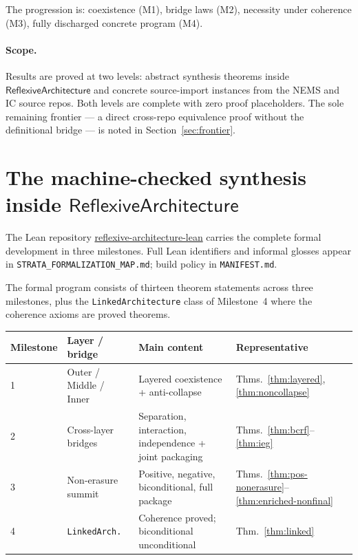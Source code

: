 \documentclass[11pt]{article}
\newcommand{\RAL}{\ensuremath{\mathsf{ReflexiveArchitecture}}}
\begin{document}
The progression is: coexistence (M1), bridge laws (M2), necessity under coherence (M3),
fully discharged concrete program (M4).

\paragraph{Scope.}
Results are proved at two levels: abstract synthesis theorems inside $\RAL$
and concrete source-import instances from the NEMS and IC source repos.
Both levels are complete with zero proof placeholders.  The sole remaining
frontier --- a direct cross-repo equivalence proof without the definitional bridge ---
is noted in Section~\ref{sec:frontier}.

\section{The machine-checked synthesis inside \texorpdfstring{$\RAL$}{RAL}}
\label{sec:formalization}

The Lean repository \url{reflexive-architecture-lean} carries the complete formal
development in three milestones.  Full Lean identifiers and informal glosses appear
in \texttt{STRATA\_FORMALIZATION\_MAP.md}; build policy in \texttt{MANIFEST.md}.

The formal program consists of thirteen theorem statements across three milestones,
plus the \texttt{LinkedArchitecture} class of Milestone~4 where the coherence axioms
are proved theorems.

\begin{center}
\small
\setlength{\tabcolsep}{4pt}
\begin{tabular}{p{1.7cm}p{2.8cm}p{4.7cm}p{2.6cm}}
\toprule
Milestone & Layer / bridge & Main content & Representative \\
\midrule
1 & Outer / Middle / Inner & Layered coexistence + anti-collapse
  & Thms.~\ref{thm:layered}, \ref{thm:noncollapse} \\[2pt]
2 & Cross-layer bridges & Separation, interaction, independence + joint packaging
  & Thms.~\ref{thm:bcrf}--\ref{thm:ieg} \\[2pt]
3 & Non-erasure summit & Positive, negative, biconditional, full package
  & Thms.~\ref{thm:pos-nonerasure}--\ref{thm:enriched-nonfinal} \\[2pt]
4 & \texttt{LinkedArch.} & Coherence proved; biconditional unconditional
  & Thm.~\ref{thm:linked} \\
\bottomrule
\end{tabular}
\end{center}
\end{document}

